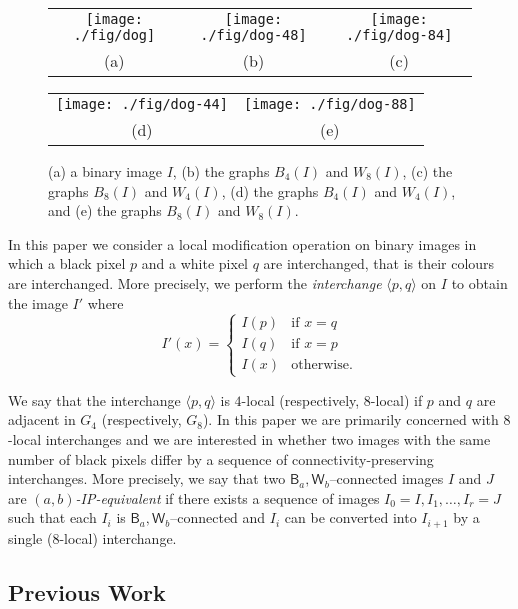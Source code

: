 \documentclass[lotsofwhite,charterfonts]{patmorin}
\newcommand{\ic}[2]{\langle #1,#2 \rangle}
\begin{document}
\begin{figure}[htbp]
\begin{center}\begin{tabular}{ccc}
\texttt{[image: ./fig/dog]} & 
\texttt{[image: ./fig/dog-48]} &
\texttt{[image: ./fig/dog-84]} \\
(a) & (b) & (c) \\
\end{tabular}\end{center}
\begin{center}\begin{tabular}{cc}
\texttt{[image: ./fig/dog-44]} & \texttt{[image: ./fig/dog-88]} \\
(d) & (e) \\
\end{tabular}\end{center}
\caption{(a) a binary image $I$, (b) the graphs $B_4(I)$ and $W_8(I)$, (c)
the graphs $B_8(I)$ and $W_4(I)$, (d) the graphs $B_4(I)$ and $W_4(I)$, and (e) the graphs $B_8(I)$ and $W_8(I)$.}
\end{figure}


In this paper we consider a local modification operation on binary
images in which a black pixel $p$ and a white pixel $q$ are
interchanged, that is their colours are interchanged.  More precisely, we perform the \emph{interchange}
$\ic{p}{q}$ on $I$ to obtain the image $I'$ where
\[
     I'(x) = \left\{\begin{array}{ll}
         I(p) & \mbox{if $x=q$} \\
         I(q) & \mbox{if $x=p$} \\
         I(x) & \mbox{otherwise.}\end{array}\right.
\]

We say that the interchange $\ic{p}{q}$ is $4$-local (respectively,
$8$-local) if $p$ and $q$ are adjacent in $G_4$ (respectively, $G_8$).
In this paper we are primarily concerned with $8$-local interchanges
and we are interested in whether two images with the same number of
black pixels differ by a sequence of connectivity-preserving
interchanges.  More precisely, we say that two $\textsf{B}_a,\textsf{W}_b$--connected images $I$ and $J$ are \emph{$(a,b)$-IP-equivalent}
\cite{rn02} if there exists a sequence of images $I_0=I,I_1,\ldots,I_r=J$ such that each $I_i$ is $\textsf{B}_a,\textsf{W}_b$--connected and $I_{i}$ can be converted into $I_{i+1}$ by a single (8-local) interchange.

\subsection{Previous Work}
\end{document}

